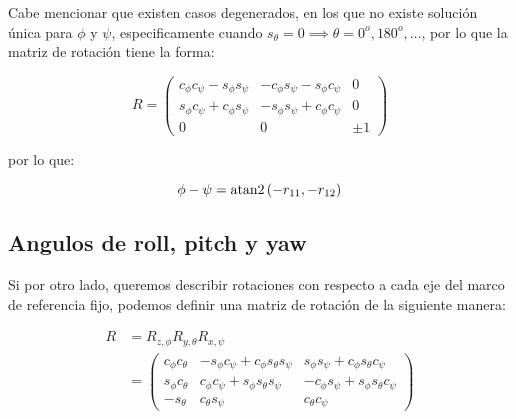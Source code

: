 \begin{multicols*}{3}
            Cabe mencionar que existen casos degenerados, en los que no existe solución única para $\phi$ y $\psi$, especificamente cuando $s_{\theta} = 0 \implies \theta = 0^o, 180^o, \dots$, por lo que la matriz de rotación tiene la forma:

            \begin{equation*}
                R =
                \begin{pmatrix}
                    c_{\phi} c_{\psi} - s_{\phi} s_{\psi} & - c_{\phi} s_{\psi} - s_{\phi} c_{\psi} & 0 \\
                    s_{\phi} c_{\psi} + c_{\phi} s_{\psi} & - s_{\phi} s_{\psi} + c_{\phi} c_{\psi} & 0 \\
                    0 & 0 & \pm 1
                \end{pmatrix}
            \end{equation*}

            por lo que:

            \begin{equation}
                \phi - \psi = \operatorname{atan2}{(-r_{11}, -r_{12})}
            \end{equation}


        \subsection{Angulos de roll, pitch y yaw}

            Si por otro lado, queremos describir rotaciones con respecto a cada eje del marco de referencia fijo, podemos definir una matriz de rotación de la siguiente manera:

            \begin{align}
                R &= R_{z, \phi} R_{y, \theta} R_{x, \psi} \nonumber \\
                &=
                \begin{pmatrix}
                    c_{\phi} c_{\theta} & -s_{\phi} c_{\psi} + c_{\phi} s_{\theta} s_{\psi} & s_{\phi} s_{\psi} + c_{\phi} s_{\theta} c_{\psi} \\
                    s_{\phi} c_{\theta} & c_{\phi} c_{\psi} + s_{\phi} s_{\theta} s_{\psi} & -c_{\phi} s_{\psi} + s_{\phi} s_{\theta} c_{\psi} \\
                    - s_{\theta} & c_{\theta} s_{\psi} & c_{\theta} c_{\psi}
                \end{pmatrix}
            \end{align}


\end{multicols*}
